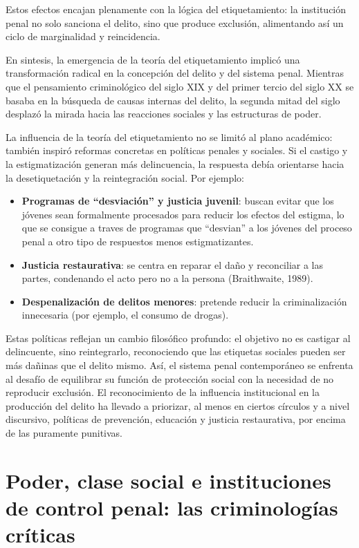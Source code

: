 \documentclass[
  spanish,
  letterpaper,
  DIV=11,
  numbers=noendperiod]{scrreprt}
\begin{document}
Estos efectos encajan plenamente con la lógica del etiquetamiento: la
institución penal no solo sanciona el delito, sino que produce
exclusión, alimentando así un ciclo de marginalidad y reincidencia.

En sintesis, la emergencia de la teoría del etiquetamiento implicó una
transformación radical en la concepción del delito y del sistema penal.
Mientras que el pensamiento criminológico del siglo XIX y del primer
tercio del siglo XX se basaba en la búsqueda de causas internas del
delito, la segunda mitad del siglo desplazó la mirada hacia las
reacciones sociales y las estructuras de poder.

La influencia de la teoría del etiquetamiento no se limitó al plano
académico: también inspiró reformas concretas en políticas penales y
sociales. Si el castigo y la estigmatización generan más delincuencia,
la respuesta debía orientarse hacia la desetiquetación y la
reintegración social. Por ejemplo:

\begin{itemize}
\item
  \textbf{Programas de ``desviación'' y justicia juvenil}: buscan evitar
  que los jóvenes sean formalmente procesados para reducir los efectos
  del estigma, lo que se consigue a traves de programas que ``desvian''
  a los jóvenes del proceso penal a otro tipo de respuestos menos
  estigmatizantes.
\item
  \textbf{Justicia restaurativa}: se centra en reparar el daño y
  reconciliar a las partes, condenando el acto pero no a la persona
  (Braithwaite, 1989).
\item
  \textbf{Despenalización de delitos menores}: pretende reducir la
  criminalización innecesaria (por ejemplo, el consumo de drogas).
\end{itemize}

Estas políticas reflejan un cambio filosófico profundo: el objetivo no
es castigar al delincuente, sino reintegrarlo, reconociendo que las
etiquetas sociales pueden ser más dañinas que el delito mismo. Así, el
sistema penal contemporáneo se enfrenta al desafío de equilibrar su
función de protección social con la necesidad de no reproducir
exclusión. El reconocimiento de la influencia institucional en la
producción del delito ha llevado a priorizar, al menos en ciertos
círculos y a nivel discursivo, políticas de prevención, educación y
justicia restaurativa, por encima de las puramente punitivas.

\section{Poder, clase social e instituciones de control penal: las
criminologías
críticas}\label{poder-clase-social-e-instituciones-de-control-penal-las-criminologuxedas-cruxedticas}
\end{document}
